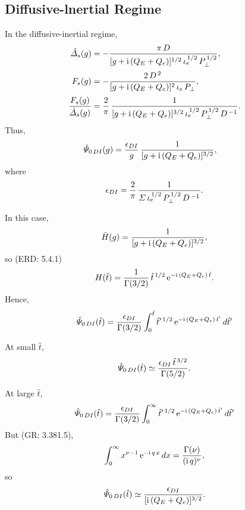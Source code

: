 \documentclass[titlepage=false,12pt]{article}
\begin{document}
\subsection{Diffusive-lnertial Regime}
In the diffusive-inertial regime, 
\begin{align}
\hat{\mit\Delta}_s(g)& = -\frac{\pi\,D}{[g+{\rm i}\,(Q_E+Q_e)]^{1/2}\,\iota_e^{\,1/2}\,P_\perp^{\,1/2}},\\[0.5ex]
F_s(g)&=-\frac{2\,D^{\,2}}{[g+{\rm i}\,(Q_E+Q_e)]^{2}\,\iota_e\,P_\perp},\\[0.5ex]
\frac{F_s(g)}{\hat{\mit\Delta}_s(g)}&=\frac{2}{\pi}\, \frac{1}{[g+{\rm i}\,(Q_E+Q_e)]^{3/2}\,\iota_e^{\,1/2}\,P_\perp^{\,1/2}\,D^{\,-1}}.
\end{align}
Thus,
\begin{align}
\tilde{\mit\Psi}_{0\,DI}(g) &=\frac{\epsilon_{DI}}{g}\,\frac{1}{[g+{\rm i}\,(Q_E+Q_e)]^{3/2}},
\end{align}
where
\begin{equation}
\epsilon_{DI} = \frac{2}{\pi}\,\frac{1}{{\mit\Sigma}\,\iota_e^{\,1/2}\,P_\perp^{\,1/2}\,D^{\,-1}}.
\end{equation}

In this case,
\begin{equation}
\bar{H}(g) = \frac{1}{[g+{\rm i}\,(Q_E+Q_e)]^{3/2}},
\end{equation}
so (ERD: 5.4.1)
\begin{equation}
H(\hat{t}) = \frac{1}{\Gamma(3/2)}\,\hat{t}^{\,1/2}\,{\rm e}^{-{\rm i}\,(Q_E+Q_e)\,\hat{t}}.
\end{equation}
Hence,
\begin{equation}
\hat{\mit\Psi}_{0\,DI}(\hat{t}) =\frac{\epsilon_{DI}}{\Gamma(3/2)}\int_0^{\hat{t}}
\hat{t}'^{\,1/2}\,{\rm e}^{-{\rm i}\,(Q_E+Q_e)\,\hat{t}'}\,d\hat{t}'
\end{equation}

At small $\hat{t}$,
\begin{equation}
\hat{\mit\Psi}_{0\,DI}(\hat{t}) \simeq \frac{\epsilon_{DI}\,\hat{t}^{\,3/2}}{\Gamma(5/2)}.
\end{equation}

At large $\hat{t}$, 
\begin{equation}
\hat{\mit\Psi}_{0\,DI}(\hat{t}) =\frac{\epsilon_{DI}}{\Gamma(3/2)}\int_0^{\infty}
\hat{t}'^{\,1/2}\,{\rm e}^{-{\rm i}\,(Q_E+Q_e)\,\hat{t}'}\,d\hat{t}'
\end{equation}
But (GR: 3.381.5), 
\begin{equation}
\int_0^\infty x^{\nu-1}\,{\rm e}^{-{\rm i}\,q\,x}\,dx = \frac{\Gamma(\nu)}{({\rm i}\,q)^{\nu}},
\end{equation}
so 
\begin{equation}
\hat{\mit\Psi}_{0\,DI}(\hat{t}) \simeq \frac{\epsilon_{DI}}{[{\rm i}\,(Q_E+Q_e)]^{3/2}}.
\end{equation}
\end{document}

